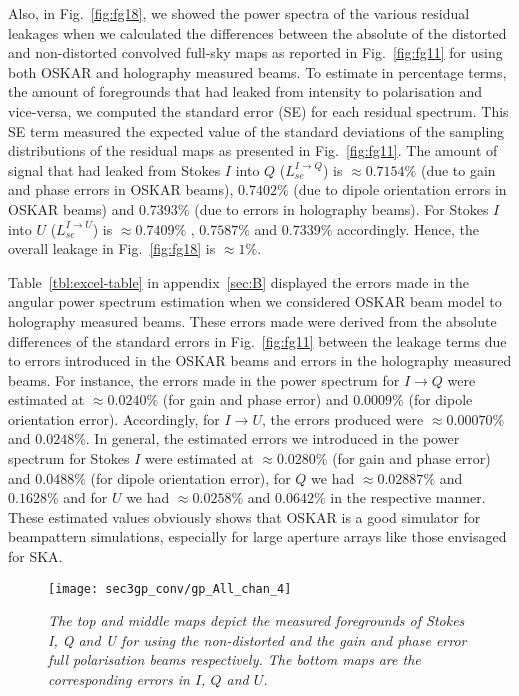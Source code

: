 \documentclass[fleqn,usenatbib]{mnras}
\begin{document}
Also, in Fig.~\ref{fig:fg18}, we showed the power spectra of the various residual leakages when we calculated the differences between the absolute of the distorted and non-distorted convolved full-sky maps as reported in Fig.~\ref{fig:fg11} for using both OSKAR and holography measured beams. To estimate in percentage terms, the amount of  foregrounds that had leaked from intensity to polarisation and vice-versa, we computed the standard error (SE) for each residual spectrum. This SE term measured the expected value of the standard deviations of the sampling distributions of the residual maps as presented in Fig.~\ref{fig:fg11}. The amount of signal that had leaked from Stokes $I$ into $Q$ ($ L_{se}^{I \longrightarrow Q}$) is $\approx 0.7154 \%$ (due to gain and phase errors in OSKAR beams), $0.7402 \%$ (due to dipole orientation errors in OSKAR beams) and $ 0.7393 \%$ (due to errors in holography beams). For Stokes $I$ into $U$ ($ L_{se}^{I \longrightarrow U}$) is $\approx 0.7409 \%$ , $0.7587 \%$  and $ 0.7339 \%$ accordingly.  Hence, the overall leakage in Fig.~\ref{fig:fg18} is $\approx 1 \%$.

Table~\ref{tbl:excel-table} in appendix~\ref{sec:B} displayed the errors made in the angular power spectrum estimation when we considered OSKAR beam model to holography measured beams. These errors made were derived from the absolute differences of the standard errors in Fig.~\ref{fig:fg11} between the leakage terms due to errors introduced in the OSKAR beams and errors in the holography measured beams. For instance, the errors made in the power spectrum for $I \rightarrow Q$ were estimated at $\approx 0.0240 \%$ (for gain and phase error) and $ 0.0009 \%$ (for dipole orientation error). Accordingly, for $I \rightarrow U$, the errors produced were $\approx 0.00070 \%$ and $ 0.0248 \%$. In general, the estimated errors we introduced in the power spectrum for Stokes $I$ were estimated at $\approx 0.0280 \%$ (for gain and phase error) and $ 0.0488 \%$ (for dipole orientation error), for $Q$ we had $\approx 0.02887 \%$ and $0.1628 \%$ and for $U$ we had  $\approx 0.0258 \%$ and $0.0642 \%$ in the respective manner. These estimated values obviously shows that OSKAR is a good simulator for beampattern simulations, especially for large aperture arrays like those envisaged for SKA.


\begin{figure*}
\begin{minipage}[H]{\linewidth}
      \centering      
      \texttt{[image: sec3gp\_conv/gp\_All\_chan\_4]}
    \end{minipage}
     \caption{\textit{The top and middle maps depict the measured foregrounds of Stokes I, Q and U  for using the non-distorted and the gain and phase error full polarisation beams respectively. The bottom maps are the corresponding errors in $I$, $Q$ and $U$.}}
	    \label{fig:fgGP}    
    \end{figure*}
  
\end{document}
